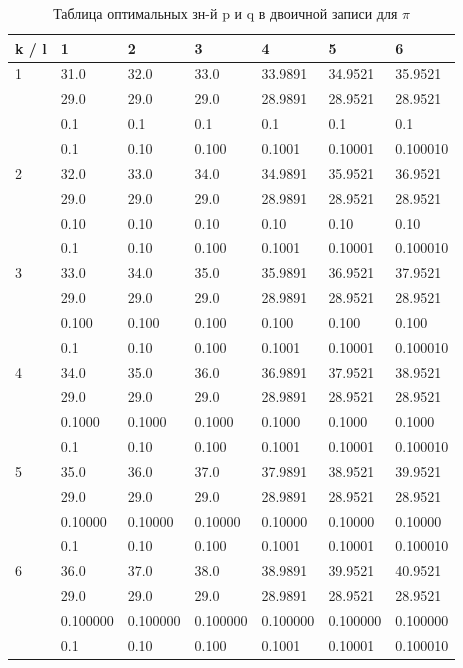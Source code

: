 \documentclass[12pt]{article}
\begin{document}
	
	\begin{table}[h]
		\caption{Таблица оптимальных зн-й p и q в двоичной записи для $\pi$}
		\label{table:piBinary}
		\begin{center}
			\begin{tabular}{|l|l|l|l|l|l|l|}
				\hline
				k / l &1 & 2 & 3 & 4 & 5 & 6\\
				\hline
				1 & 31.0& 32.0& 33.0& 33.9891& 34.9521& 35.9521\\
				& 29.0& 29.0& 29.0& 28.9891& 28.9521& 28.9521\\
				& 0.1& 0.1& 0.1& 0.1& 0.1& 0.1\\
				& 0.1& 0.10& 0.100& 0.1001& 0.10001& 0.100010\\
				\hline
				2 & 32.0& 33.0& 34.0& 34.9891& 35.9521& 36.9521\\
				& 29.0& 29.0& 29.0& 28.9891& 28.9521& 28.9521\\
				& 0.10& 0.10& 0.10& 0.10& 0.10& 0.10\\
				& 0.1& 0.10& 0.100& 0.1001& 0.10001& 0.100010\\
				\hline
				3 & 33.0& 34.0& 35.0& 35.9891& 36.9521& 37.9521\\
				& 29.0& 29.0& 29.0& 28.9891& 28.9521& 28.9521\\
				& 0.100& 0.100& 0.100& 0.100& 0.100& 0.100\\
				& 0.1& 0.10& 0.100& 0.1001& 0.10001& 0.100010\\
				\hline
				4 & 34.0& 35.0& 36.0& 36.9891& 37.9521& 38.9521\\
				& 29.0& 29.0& 29.0& 28.9891& 28.9521& 28.9521\\
				& 0.1000& 0.1000& 0.1000& 0.1000& 0.1000& 0.1000\\
				& 0.1& 0.10& 0.100& 0.1001& 0.10001& 0.100010\\
				\hline
				5 & 35.0& 36.0& 37.0& 37.9891& 38.9521& 39.9521\\
				& 29.0& 29.0& 29.0& 28.9891& 28.9521& 28.9521\\
				& 0.10000& 0.10000& 0.10000& 0.10000& 0.10000& 0.10000\\
				& 0.1& 0.10& 0.100& 0.1001& 0.10001& 0.100010\\
				\hline
				6 & 36.0& 37.0& 38.0& 38.9891& 39.9521& 40.9521\\
				& 29.0& 29.0& 29.0& 28.9891& 28.9521& 28.9521\\
				& 0.100000& 0.100000& 0.100000& 0.100000& 0.100000& 0.100000\\
				& 0.1& 0.10& 0.100& 0.1001& 0.10001& 0.100010\\
				\hline
			\end{tabular}
		\end{center}
	\end{table}
	
\end{document}
